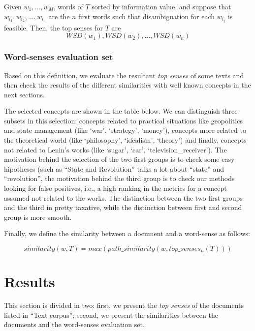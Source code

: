 \documentclass{pnastwo}
\begin{document}
\begin{article}
Given $w_1, \ldots, w_M$, words of $T$ sorted by information value, and suppose that $w_{i_1}, w_{i_2}, \ldots, w_{i_n}$ are the $n$ first words  such that disambiguation for each $w_{i_j}$ is feasible. Then, the top senses for $T$ are
\begin{equation}
  WSD(w_1), WSD(w_2), \ldots, WSD(w_n)
\end{equation}

\subsubsection{Word-senses evaluation set}

Based on this definition, we evaluate the resultant \textit{top senses} of some texts and then check the results of the different similarities with well known concepts in the next sections.

The selected concepts are shown in the table below. We can distinguish three subsets in this selection: concepts related to practical situations like geopolitics and state management (like `war', `strategy', `money'), concepts more related to the theoretical world (like  `philosophy', `idealism', `theory') and finally, concepts not related to Lenin's works (like `sugar', `car', `television\_receiver'). The motivation behind the selection of the two first groups is to check some easy hipotheses (such as ``State and Revolution'' talks a lot about ``state'' and ``revolution'', the motivation behind the third group is to check our methods looking for false positives, i.e., a high ranking in the metrics for a concept assumed not related to the works. The distinction between the two first groups and the third in pretty taxative, while the distinction between first and second group is more smooth.

Finally, we define the similarity between a document and a word-sense as follows:

\begin{equation}
  similarity(w, T) = max(path\_similarity(w, top\_senses_n(T)))
\end{equation}



\section{Results}
This section is divided in two: first, we present the \textit{top senses} of the documents listed in ``Text corpus''; second, we present the similarities between the documents and the word-senses evaluation set.


\end{article}
\end{document}
